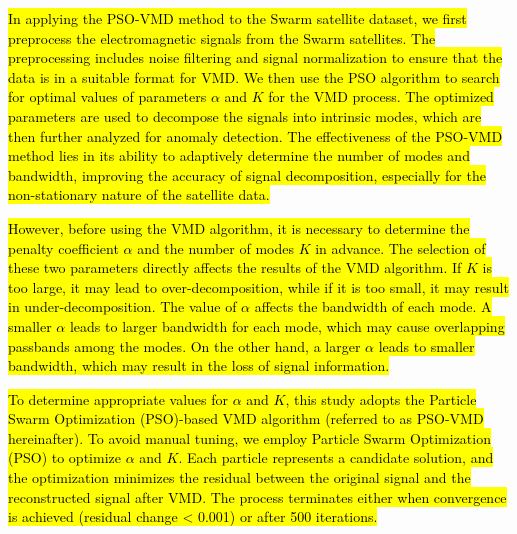 \documentclass[3p,authoryear,preprint,12pt]{elsarticle}
\begin{document}
\hl{In applying the PSO-VMD method to the Swarm satellite dataset, we first preprocess the electromagnetic signals from the Swarm satellites. The preprocessing includes noise filtering and signal normalization to ensure that the data is in a suitable format for VMD. We then use the PSO algorithm to search for optimal values of parameters $\alpha$ and $K$ for the VMD process. The optimized parameters are used to decompose the signals into intrinsic modes, which are then further analyzed for anomaly detection. The effectiveness of the PSO-VMD method lies in its ability to adaptively determine the number of modes and bandwidth, improving the accuracy of signal decomposition, especially for the non-stationary nature of the satellite data.}


\hl{However, before using the VMD algorithm, it is necessary to determine the penalty coefficient $\alpha$ and the number of modes $K$ in advance. The selection of these two parameters directly affects the results of the VMD algorithm. If $K$ is too large, it may lead to over-decomposition, while if it is too small, it may result in under-decomposition. The value of $\alpha$ affects the bandwidth of each mode. A smaller $\alpha$ leads to larger bandwidth for each mode, which may cause overlapping passbands among the modes. On the other hand, a larger $\alpha$ leads to smaller bandwidth, which may result in the loss of signal information.}

\hl{To determine appropriate values for $\alpha$ and $K$, this study adopts the Particle Swarm Optimization (PSO)-based VMD algorithm (referred to as PSO-VMD hereinafter). To avoid manual tuning, we employ Particle Swarm Optimization (PSO) to optimize $\alpha$ and $K$. Each particle represents a candidate solution, and the optimization minimizes the residual between the original signal and the reconstructed signal after VMD. The process terminates either when convergence is achieved (residual change < 0.001) or after 500 iterations.
}
\end{document}

